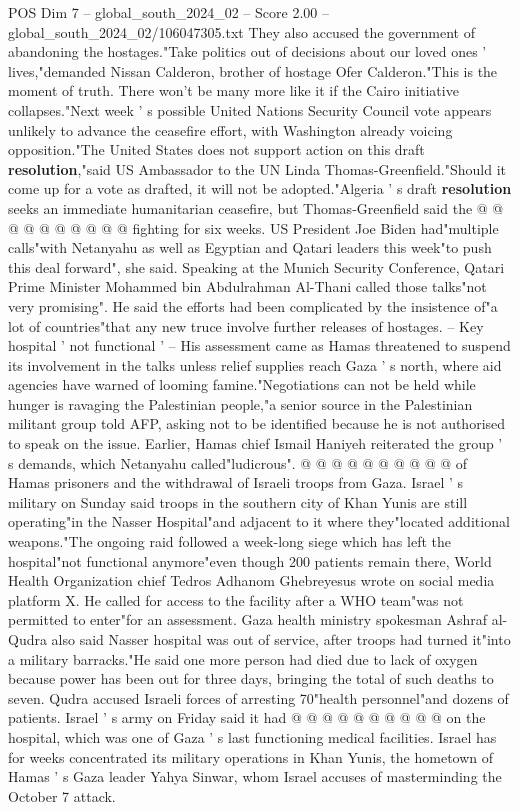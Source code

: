 \begin{textsample}{POS Dim 7 – global\_south\_2024\_02 – Score 2.00 – global\_south\_2024\_02/106047305.txt}
They also accused the government of abandoning the hostages."Take politics out of decisions about our loved ones ' lives,"demanded Nissan Calderon, brother of hostage Ofer Calderon."This is the moment of truth.
There won't be many more like it if the Cairo initiative collapses."Next week ' s possible United Nations Security Council vote appears unlikely to advance the ceasefire effort, with Washington already voicing opposition."The United States does not support action on this draft \textbf{resolution},"said US Ambassador to the UN Linda Thomas-Greenfield."Should it come up for a vote as drafted, it will not be adopted."Algeria ' s draft \textbf{resolution} seeks an immediate humanitarian ceasefire, but Thomas-Greenfield said the @ @ @ @ @ @ @ @ @ @ fighting for six weeks.
US President Joe Biden had"multiple calls"with Netanyahu as well as Egyptian and Qatari leaders this week"to push this deal forward", she said.
Speaking at the Munich Security Conference, Qatari Prime Minister Mohammed bin Abdulrahman Al-Thani called those talks"not very promising".
He said the efforts had been complicated by the insistence of"a lot of countries"that any new truce involve further releases of hostages. -- Key hospital ' not functional ' -- His assessment came as Hamas threatened to suspend its involvement in the talks unless relief supplies reach Gaza ' s north, where aid agencies have warned of looming famine."Negotiations can not be held while hunger is ravaging the Palestinian people,"a senior source in the Palestinian militant group told AFP, asking not to be identified because he is not authorised to speak on the issue.
Earlier, Hamas chief Ismail Haniyeh reiterated the group ' s demands, which Netanyahu called"ludicrous". @ @ @ @ @ @ @ @ @ @ of Hamas prisoners and the withdrawal of Israeli troops from Gaza.
Israel ' s military on Sunday said troops in the southern city of Khan Yunis are still operating"in the Nasser Hospital"and adjacent to it where they"located additional weapons."The ongoing raid followed a week-long siege which has left the hospital"not functional anymore"even though 200 patients remain there, World Health Organization chief Tedros Adhanom Ghebreyesus wrote on social media platform X.
He called for access to the facility after a WHO team"was not permitted to enter"for an assessment.
Gaza health ministry spokesman Ashraf al-Qudra also said Nasser hospital was out of service, after troops had turned it"into a military barracks."He said one more person had died due to lack of oxygen because power has been out for three days, bringing the total of such deaths to seven.
Qudra accused Israeli forces of arresting 70"health personnel"and dozens of patients.
Israel ' s army on Friday said it had @ @ @ @ @ @ @ @ @ @ on the hospital, which was one of Gaza ' s last functioning medical facilities.
Israel has for weeks concentrated its military operations in Khan Yunis, the hometown of Hamas ' s Gaza leader Yahya Sinwar, whom Israel accuses of masterminding the October 7 attack.

\end{textsample}
